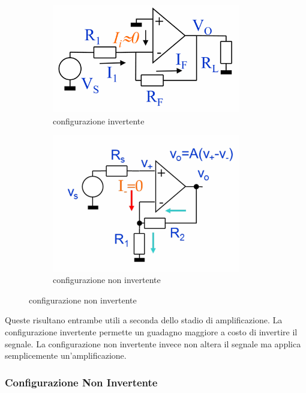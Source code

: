 \begin{figure}[!h]
    \centering
    \begin{subfigure}[b]{0.45\textwidth}
        \includegraphics[width=0.9\textwidth]{analog/assets/scheda analogica/invertente.png}
        \caption{configurazione invertente}
    \end{subfigure}%
    \begin{subfigure}[b]{0.45\textwidth}
        \includegraphics[width=0.9\textwidth]{analog/assets/scheda analogica/non_invertente.png}
        \caption{configurazione non invertente}
    \end{subfigure}
\end{figure}

Queste risultano entrambe utili a seconda dello stadio di amplificazione. La configurazione invertente permette un guadagno maggiore a costo di invertire il segnale.
La configurazione non invertente invece non altera il segnale ma applica semplicemente un'amplificazione.

\subsubsection{Configurazione Non Invertente}

